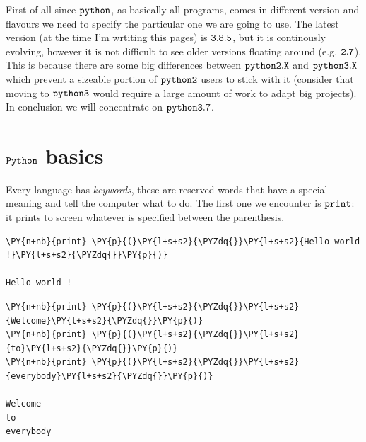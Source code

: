 First of all since $\tt{python}$, as basically all programs, comes in different version and flavours we need to specify the particular one we are going to use.
The latest version (at the time I'm wrtiting this pages) is \(\tt{3.8.5}\), but it is continously evolving, however it is not difficult to see older versions floating around (e.g. \(\tt{2.7}\)).
This is because there are some big differences between \(\tt{python 2.X}\) and \(\tt{python 3.X}\) which prevent a sizeable portion of \(\tt{python 2}\) users to stick with it (consider that moving to \(\tt{python 3}\) would require a large amount of work to adapt big projects).
In conclusion we will concentrate on \textbf{\(\tt{python 3.7}\)}.

\section{$\tt{Python}$ basics}\label{python-basics}

Every language has \emph{keywords}, these are reserved words that have a special meaning and tell the computer what to do. The first one we encounter is \(\tt{print}\): it prints to screen whatever is specified between the parenthesis.

\begin{tcolorbox}[breakable, size=fbox, boxrule=1pt, pad at break*=1mm, colback=cellbackground, colframe=cellborder]
\begin{Verbatim}[commandchars=\\\{\}]
\PY{n+nb}{print} \PY{p}{(}\PY{l+s+s2}{\PYZdq{}}\PY{l+s+s2}{Hello world !}\PY{l+s+s2}{\PYZdq{}}\PY{p}{)} 

Hello world !
\end{Verbatim}
\end{tcolorbox}

\begin{tcolorbox}[breakable, size=fbox, boxrule=1pt, pad at break*=1mm, colback=cellbackground, colframe=cellborder]
\begin{Verbatim}[commandchars=\\\{\}]
\PY{n+nb}{print} \PY{p}{(}\PY{l+s+s2}{\PYZdq{}}\PY{l+s+s2}{Welcome}\PY{l+s+s2}{\PYZdq{}}\PY{p}{)}
\PY{n+nb}{print} \PY{p}{(}\PY{l+s+s2}{\PYZdq{}}\PY{l+s+s2}{to}\PY{l+s+s2}{\PYZdq{}}\PY{p}{)}
\PY{n+nb}{print} \PY{p}{(}\PY{l+s+s2}{\PYZdq{}}\PY{l+s+s2}{everybody}\PY{l+s+s2}{\PYZdq{}}\PY{p}{)}

Welcome
to
everybody
\end{Verbatim}
\end{tcolorbox}

